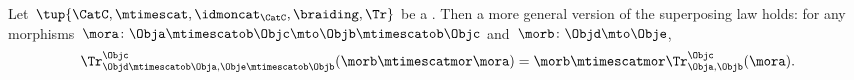 \begin{lemma}
    \label{lem:general-superposing-law}
    Let~$\tup{\CatC, \mtimescat,\idmoncat_{\CatC}, \braiding, \Tr}$ be a .
    Then a more general version of the superposing law holds: for any morphisms~$\mora\colon \Obja\mtimescatob \Objc \mto \Objb \mtimescatob \Objc$ and~$\morb \colon \Objd \mto \Obje$,
    \begin{equation}
        \label{eq:superposing_2}
        \Tr_{\Objd\mtimescatob \Obja,\Obje\mtimescatob \Objb}^{\Objc}(\morb \mtimescatmor \mora)=\morb \mtimescatmor \Tr_{\Obja,\Objb}^\Objc(\mora).
    \end{equation}
\end{lemma}
\missingproof


